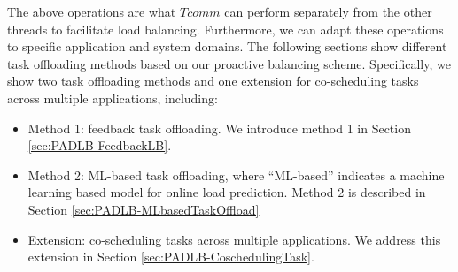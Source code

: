 
The above operations are what $Tcomm$ can perform separately from the other threads to facilitate load balancing. Furthermore, we can adapt these operations to specific application and system domains. The following sections show different task offloading methods based on our proactive balancing scheme. Specifically, we show two task offloading methods and one extension for co-scheduling tasks across multiple applications, including:

\begin{itemize}
	\item Method 1: feedback task offloading. We introduce method 1 in Section \ref{sec:PADLB-FeedbackLB}.
	\item Method 2: ML-based task offloading, where ``ML-based'' indicates a machine learning based model for online load prediction. Method 2 is described in Section \ref{sec:PADLB-MLbasedTaskOffload}
	\item Extension: co-scheduling tasks across multiple applications. We address this extension in Section \ref{sec:PADLB-CoschedulingTask}.
\end{itemize}



 
%



